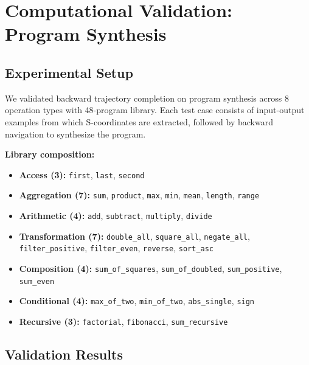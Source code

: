 \documentclass[twocolumn,10pt]{revtex4-2}
\theoremstyle{definition}
\theoremstyle{remark}
\begin{document}
\section{Computational Validation: Program Synthesis}
\label{sec:program_synthesis_validation}

\subsection{Experimental Setup}

We validated backward trajectory completion on program synthesis across 8 operation types with 48-program library. Each test case consists of input-output examples from which S-coordinates are extracted, followed by backward navigation to synthesize the program.

\textbf{Library composition:}
\begin{itemize}
\item \textbf{Access (3):} \texttt{first}, \texttt{last}, \texttt{second}
\item \textbf{Aggregation (7):} \texttt{sum}, \texttt{product}, \texttt{max}, \texttt{min}, \texttt{mean}, \texttt{length}, \texttt{range}
\item \textbf{Arithmetic (4):} \texttt{add}, \texttt{subtract}, \texttt{multiply}, \texttt{divide}
\item \textbf{Transformation (7):} \texttt{double\_all}, \texttt{square\_all}, \texttt{negate\_all}, \texttt{filter\_positive}, \texttt{filter\_even}, \texttt{reverse}, \texttt{sort\_asc}
\item \textbf{Composition (4):} \texttt{sum\_of\_squares}, \texttt{sum\_of\_doubled}, \texttt{sum\_positive}, \texttt{sum\_even}
\item \textbf{Conditional (4):} \texttt{max\_of\_two}, \texttt{min\_of\_two}, \texttt{abs\_single}, \texttt{sign}
\item \textbf{Recursive (3):} \texttt{factorial}, \texttt{fibonacci}, \texttt{sum\_recursive}
\end{itemize}

\subsection{Validation Results}
\end{document}
